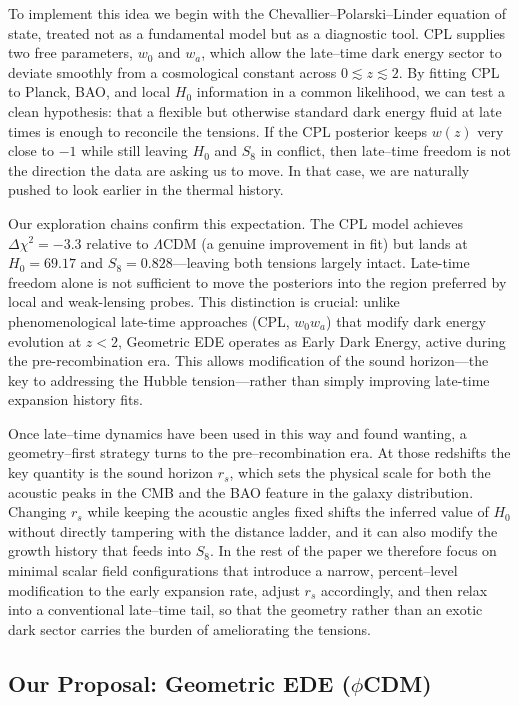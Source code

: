 \documentclass[a4paper,11pt]{article}
\begin{document}
To implement this idea we begin with the Chevallier--Polarski--Linder equation of state, treated not as a fundamental model but as a diagnostic tool. CPL supplies two free parameters, $w_0$ and $w_a$, which allow the late--time dark energy sector to deviate smoothly from a cosmological constant across $0 \lesssim z \lesssim 2$. By fitting CPL to Planck, BAO, and local $H_0$ information in a common likelihood, we can test a clean hypothesis: that a flexible but otherwise standard dark energy fluid at late times is enough to reconcile the tensions. If the CPL posterior keeps $w(z)$ very close to $-1$ while still leaving $H_0$ and $S_8$ in conflict, then late--time freedom is not the direction the data are asking us to move. In that case, we are naturally pushed to look earlier in the thermal history.

Our exploration chains confirm this expectation. The CPL model achieves $\Delta\chi^2 = -3.3$ relative to $\Lambda$CDM (a genuine improvement in fit) but lands at $H_0 = 69.17$ and $S_8 = 0.828$---leaving both tensions largely intact. Late-time freedom alone is not sufficient to move the posteriors into the region preferred by local and weak-lensing probes. This distinction is crucial: unlike phenomenological late-time approaches (CPL, $w_0 w_a$) that modify dark energy evolution at $z < 2$, Geometric EDE operates as Early Dark Energy, active during the pre-recombination era. This allows modification of the sound horizon---the key to addressing the Hubble tension---rather than simply improving late-time expansion history fits.

Once late--time dynamics have been used in this way and found wanting, a geometry--first strategy turns to the pre--recombination era. At those redshifts the key quantity is the sound horizon $r_s$, which sets the physical scale for both the acoustic peaks in the CMB and the BAO feature in the galaxy distribution. Changing $r_s$ while keeping the acoustic angles fixed shifts the inferred value of $H_0$ without directly tampering with the distance ladder, and it can also modify the growth history that feeds into $S_8$. In the rest of the paper we therefore focus on minimal scalar field configurations that introduce a narrow, percent--level modification to the early expansion rate, adjust $r_s$ accordingly, and then relax into a conventional late--time tail, so that the geometry rather than an exotic dark sector carries the burden of ameliorating the tensions.

\subsection{Our Proposal: Geometric EDE ($\phi$CDM)}
\end{document}
